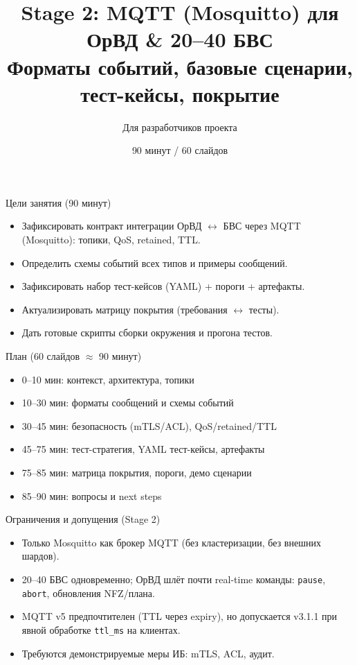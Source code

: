 \documentclass[aspectratio=169]{beamer}
\title[MQTT/Mosquitto Stage 2]{Stage 2: MQTT (Mosquitto) для ОрВД \& 20--40 БВС\\Форматы событий, базовые сценарии, тест-кейсы, покрытие}
\author{Для разработчиков проекта}
\date{90 минут / 60 слайдов}
\begin{document}
\begin{frame}
  \titlepage
\end{frame}

\begin{frame}{Цели занятия (90 минут)}
\begin{itemize}
  \item Зафиксировать контракт интеграции ОрВД $\leftrightarrow$ БВС через MQTT (Mosquitto): топики, QoS, retained, TTL.
  \item Определить схемы событий всех типов и примеры сообщений.
  \item Зафиксировать набор тест-кейсов (YAML) + пороги + артефакты.
  \item Актуализировать матрицу покрытия (требования $\leftrightarrow$ тесты).
  \item Дать готовые скрипты сборки окружения и прогона тестов.
\end{itemize}
\end{frame}

\begin{frame}{План (60 слайдов $\approx$ 90 минут)}
\begin{itemize}
  \item 0--10 мин: контекст, архитектура, топики
  \item 10--30 мин: форматы сообщений и схемы событий
  \item 30--45 мин: безопасность (mTLS/ACL), QoS/retained/TTL
  \item 45--75 мин: тест-стратегия, YAML тест-кейсы, артефакты
  \item 75--85 мин: матрица покрытия, пороги, демо сценарии
  \item 85--90 мин: вопросы и next steps
\end{itemize}
\end{frame}

\begin{frame}{Ограничения и допущения (Stage 2)}
\begin{itemize}
  \item Только Mosquitto как брокер MQTT (без кластеризации, без внешних шардов).
  \item 20--40 БВС одновременно; ОрВД шлёт почти real-time команды: \texttt{pause}, \texttt{abort}, обновления NFZ/плана.
  \item MQTT v5 предпочтителен (TTL через expiry), но допускается v3.1.1 при явной обработке \texttt{ttl\_ms} на клиентах.
  \item Требуются демонстрируемые меры ИБ: mTLS, ACL, аудит.
\end{itemize}
\end{frame}
\end{document}
